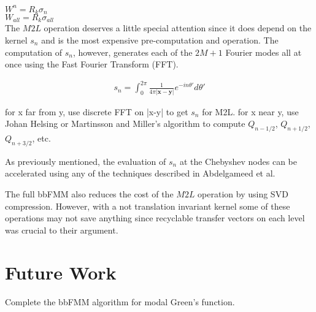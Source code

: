 \documentclass[11pt, oneside]{article}   	%
\begin{document}
$W^n=R_k \sigma_n$\\

$W_{all} = R_k \sigma_{all}$\\

The $M2L$ operation deserves a little special attention since it does depend on the kernel $s_n$ and is the most expensive pre-computation and operation. The computation of $s_n$, however, generates each of the $2M+1$ Fourier modes all at once using the Fast Fourier Transform (FFT).

\begin{align}
s_n = \int_0^{2\pi} \frac{1}{4\pi|\mathbf{x}-\mathbf{y}|}e^{-in\theta'}d\theta'
\end{align}

for x far from y, use discrete FFT on |x-y| to get $s_n$ for M2L. for x near y, use Johan Helsing or Martinsson and Miller's algorithm to compute $Q_{n-1/2}$, $Q_{n+1/2}$, $Q_{n+3/2}$, etc.

As previously mentioned, the evaluation of $s_n$ at the Chebyshev nodes can be accelerated using any of the techniques described in Abdelgameed et al.

The full bbFMM also reduces the cost of the $M2L$ operation by using SVD compression. However, with a not translation invariant kernel some of these operations may not save anything since recyclable transfer vectors on each level was crucial to their argument.


\section{Future Work}
Complete the bbFMM algorithm for modal Green's function.
\end{document}
